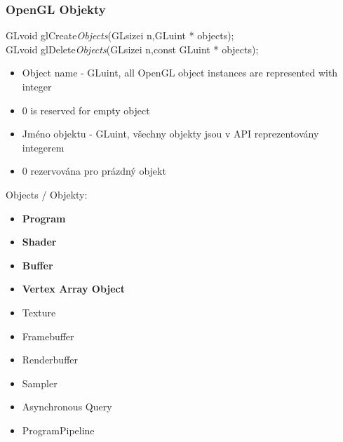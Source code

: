 \begin{frame}\frametitle{OpenGL Objekty}
  \scriptsize
  GLvoid glCreate{\it Objects}(GLsizei n,GLuint * objects);\\
  GLvoid glDelete{\it Objects}(GLsizei n,const GLuint * objects);

  \begin{itemize}
    \item Object name - GLuint, all OpenGL object instances are represented with integer
    \item 0 is reserved for empty object
  \end{itemize}

  \begin{itemize}
    \item Jméno objektu - GLuint, všechny objekty jsou v API reprezentovány integerem
    \item 0 rezervována pro prázdný objekt
  \end{itemize}

  Objects / Objekty:
  \begin{itemize}
    \item \textbf{Program}
    \item \textbf{Shader}
    \item \textbf{Buffer}
    \item \textbf{Vertex Array Object}
    \item Texture
    \item Framebuffer
    \item Renderbuffer
    \item Sampler
    \item Asynchronous Query
    \item ProgramPipeline
  \end{itemize}
\end{frame}

